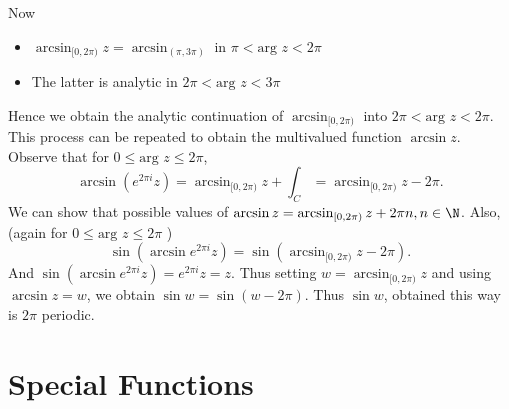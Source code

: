 \documentclass[a4paper]{article}
\begin{document}
Now 
\begin{itemize}
    \item $\arcsin_{[0, 2\pi )} z = \arcsin_{( \pi , 3 \pi )}$ in  $ \pi < \text{arg }z < 2 \pi $ 
    \item The latter is analytic in $2\pi < \text{arg } z < 3 \pi$
\end{itemize}
Hence we obtain the analytic continuation of $\arcsin_{ [0, 2\pi )}$ into $2 \pi < \text{arg } z < 2\pi$. This process can be repeated to obtain the multivalued function $\arcsin z $. Observe that for $ 0 \le \text{arg } z \le 2 \pi$,
\[
    \arcsin ( e^{ 2 \pi i } z) = \arcsin_{[0, 2\pi )} z + \int_C = \arcsin_{[ 0 , 2\pi )} z - 2\pi
.\] 
We can show that possible values of $\arcsin z = \arcsin_{[ 0, 2\pi )} z + 2\pi n, n \in \N$. Also, (again for $0 \le \text{arg }z \le 2 \pi $ ) 
\[
    \sin \left( \arcsin e^{ 2 \pi i } z\right)  = \sin \left(  \arcsin _{[0 , 2\pi )} z - 2\pi\right) 
.\] 
And $\sin \left(  \arcsin e^{ 2 \pi i } z \right)  = e^{ 2 \pi i} z = z$. Thus setting $w = \arcsin_{[0 , 2\pi)} z$ and using $\arcsin z = w$, we obtain $\sin w = \sin ( w - 2\pi)$. Thus $\sin w$, obtained this way is $2 \pi$ periodic.
\section{Special Functions}
\end{document}
